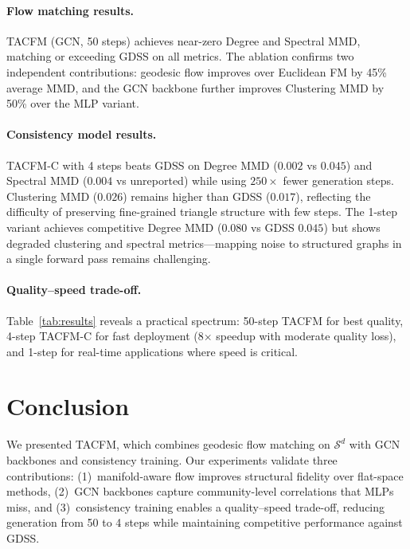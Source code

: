 \documentclass[10pt, twocolumn]{article}
\begin{document}
\paragraph{Flow matching results.}
TACFM (GCN, 50 steps) achieves near-zero Degree and Spectral MMD, matching or exceeding GDSS on all metrics. The ablation confirms two independent contributions: geodesic flow improves over Euclidean FM by 45\% average MMD, and the GCN backbone further improves Clustering MMD by 50\% over the MLP variant.

\paragraph{Consistency model results.}
TACFM-C with 4 steps beats GDSS on Degree MMD ($0.002$ vs $0.045$) and Spectral MMD ($0.004$ vs unreported) while using $250{\times}$ fewer generation steps.  Clustering MMD ($0.026$) remains higher than GDSS ($0.017$), reflecting the difficulty of preserving fine-grained triangle structure with few steps. The 1-step variant achieves competitive Degree MMD ($0.080$ vs GDSS $0.045$) but shows degraded clustering and spectral metrics---mapping noise to structured graphs in a single forward pass remains challenging.

\paragraph{Quality--speed trade-off.}
Table~\ref{tab:results} reveals a practical spectrum: 50-step TACFM for best quality, 4-step TACFM-C for fast deployment (8$\times$ speedup with moderate quality loss), and 1-step for real-time applications where speed is critical.

\section{Conclusion}

We presented TACFM, which combines geodesic flow matching on $\mathcal{S}^d$ with GCN backbones and consistency training. Our experiments validate three contributions: (1)~manifold-aware flow improves structural fidelity over flat-space methods, (2)~GCN backbones capture community-level correlations that MLPs miss, and (3)~consistency training enables a quality--speed trade-off, reducing generation from 50 to 4 steps while maintaining competitive performance against GDSS.
\end{document}
